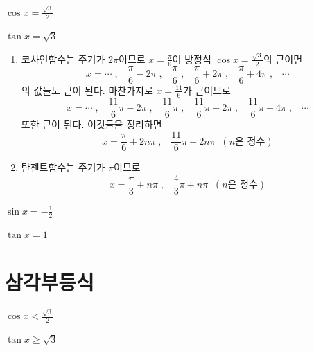 \documentclass{oblivoir}
\begin{document}
%
\label{equa2}
\begin{enumerate*}[itemjoin=\tabto{.5\textwidth}]
\item
\(\cos x=\frac{\sqrt3}2\)
\item
\(\tan x=\sqrt3\)
\end{enumerate*}
\begin{mdframed}
\begin{enumerate}
\item
코사인함수는 주기가 \(2\pi\)이므로 \(x=\frac\pi6\)이 방정식 \(\cos x=\frac{\sqrt3}2\)의 근이면
\vspace{-5pt}
\[\textstyle x=\cdots\;,\;\;\;\frac\pi6-2\pi\;,\;\;\;\frac\pi6\;,\;\;\;\frac\pi6+2\pi\;,\;\;\;\frac\pi6+4\pi\;,\;\;\;\cdots\]
의 값들도 근이 된다.
마찬가지로 \(x=\frac{11}6\)가 근이므로
\[\textstyle x=\cdots\;,\;\;\;\frac{11}6\pi-2\pi\;,\;\;\;\frac{11}6\pi\;,\;\;\;\frac{11}6\pi+2\pi\;,\;\;\;\frac{11}6\pi+4\pi\;,\;\;\;\cdots\]
또한 근이 된다.
이것들을 정리하면
\[\textstyle x=\frac\pi6+2n\pi\;,\;\;\;\frac{11}6\pi+2n\pi\;\;(n\text{은 정수})\]
\item
탄젠트함수는 주기가 \(\pi\)이므로
\[\textstyle x=\frac\pi3+n\pi\;,\;\;\;\frac43\pi+n\pi\;\;(n\text{은 정수})\]
\end{enumerate}
\end{mdframed}

%
\label{equa3}
\begin{enumerate*}[itemjoin=\tabto{.5\textwidth}]
\item
\(\sin x=-\frac12\)
\item
\(\tan x=1\)
\end{enumerate*}

\section{삼각부등식}
%
\label{ineq1}
\begin{enumerate*}[itemjoin=\tabto{.5\textwidth}]
\item
\(\cos x<\frac{\sqrt3}2\)
\item
\(\tan x\ge\sqrt3\)
\end{enumerate*}
\end{document}
